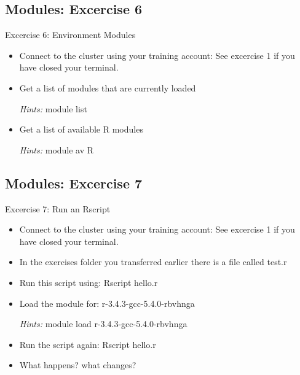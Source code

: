 \subsection{Modules: Excercise 6}
\begin{frame}[fragile]{Excercise 6: Environment Modules}
\begin{itemize}
\item{Connect to the cluster using your training account: See excercise 1 if you have closed your terminal. }
\item{Get a list of modules that are currently loaded}
\item[\emph{Hints:}]{\alert{module list}}
\item{Get a list of available R modules}
\item[\emph{Hints:}]{\alert{module av R}}
\end{itemize}
\end{frame}

\subsection{Modules: Excercise 7}
\begin{frame}[fragile]{Excercise 7: Run an Rscript}
\begin{itemize}
\item{Connect to the cluster using your training account: See excercise 1 if you have closed your terminal.}
\item{In the exercises folder you transferred earlier there is a file called test.r}
\item{Run this script using: Rscript hello.r }
\item{Load the module for: r-3.4.3-gcc-5.4.0-rbvhnga}
\item[\emph{Hints:}]{\alert{module load r-3.4.3-gcc-5.4.0-rbvhnga}}
\item{Run the script again: Rscript hello.r}
\item{What happens? what changes?}
\end{itemize}
\end{frame}

